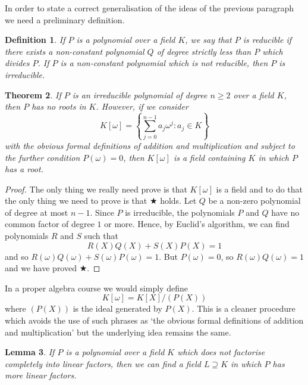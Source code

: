 \documentclass[12pt,a4paper]{article}
\theoremstyle{plain}
\newtheorem{theorem}{Theorem}[section]
\newtheorem{lemma}[theorem]{Lemma}
\newtheorem{definition}[theorem]{Definition}
\theoremstyle{definition}
\begin{document}
    In order to state a correct generalisation of the
    ideas of the previous paragraph we need a preliminary
    definition.
    \begin{definition}
        If $P$ is a polynomial over a field $K$,
        we say that $P$ is \emph{reducible} if there exists
        a non-constant polynomial $Q$ of degree strictly
        less than $P$ which divides $P$. If $P$ is a
        non-constant polynomial which is not
        reducible, then $P$ is \emph{irreducible}.
    \end{definition}
    \begin{theorem}
        \label{add ideal} If $P$ is an irreducible
        polynomial of degree $n\geq 2$ over a field $K$,
        then $P$ has
        no roots in $K$. However, if we consider
        \[K[\omega]=
        \left\{\sum_{j=0}^{n-1}a_{j}\omega^{j}:
        a_{j}\in K\right\}\]
        with the
        obvious formal definitions of addition and multiplication
        and subject to the further
        condition $P(\omega)=0$, then
        $K[\omega]$ is a field containing $K$
        in which $P$ has a root.
    \end{theorem}
    \begin{proof}
        The only thing we really
        need prove is that
        $K[\omega]$ is a field and to
        do that the only thing we need to prove is that
        $\bigstar$ holds. Let $Q$ be a non-zero
        polynomial of
        degree at most $n-1$.
        Since $P$ is irreducible,
        the polynomials $P$ and $Q$ have no common
        factor of degree $1$ or more. Hence, by
        Euclid's algorithm, we can find polynomials
        $R$ and $S$ such that
        \[R(X)Q(X)+S(X)P(X)=1\]
        and so $R(\omega)Q(\omega)+S(\omega)P(\omega)=1$.
        But $P(\omega)=0$, so $R(\omega)Q(\omega)=1$
        and we have proved $\bigstar$.
    \end{proof}
    In a proper algebra course we would simply define
    \[K[\omega]=K[X]/(P(X))\]
    where $(P(X))$ is the ideal generated by $P(X)$.
    This is a cleaner procedure which avoids the
    use of such phrases as `the
    obvious formal definitions of addition and multiplication'
    but the underlying idea remains the same.
    \begin{lemma}
        If $P$ is a polynomial over a field $K$
        which does not factorise completely into linear
        factors, then we can find a field $L\supseteq K$
        in which $P$ has more linear factors.
    \end{lemma}
\end{document}
